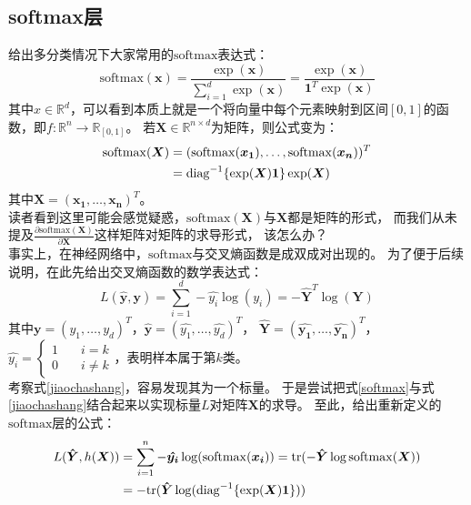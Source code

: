 \documentclass[12pt,a4paper]{ctexart}
\numberwithin{equation}{section}%
\numberwithin{figure}{section}%
\begin{document}
\subsection{softmax层}
给出多分类情况下大家常用的$\mathrm{softmax}$表达式：
\begin{equation}
\mathrm{softmax}(\boldsymbol{x})=\frac{\exp (\boldsymbol{x})}{\sum_{i=1}^d \exp(\boldsymbol{x})}
=\frac{\exp (\boldsymbol{x})}{\boldsymbol{1}^T \exp(\boldsymbol{x})}
\end{equation}
其中$x \in \mathbb{R}^d$，可以看到本质上就是一个将向量中每个元素映射到区间$[0,1]$的函数，即$f:\mathbb{R}^n \rightarrow \mathbb{R}_{[0,1]}$。
若$\boldsymbol{X} \in \mathbb{R}^{n \times d}$为矩阵，则公式变为：
\begin{align}
    \mathrm{softmax}(\boldsymbol{X})&=(\mathrm{softmax}(\boldsymbol{x_1}),\dots,\mathrm{softmax}(\boldsymbol{x_n}))^T \notag \\
    &=\mathrm{diag}^{-1}\{\exp(\boldsymbol{X})\boldsymbol{1}\} \exp(\boldsymbol{X}) \label{softmax}
\end{align}
其中$\boldsymbol{X}=(\boldsymbol{x_1},\dots,\boldsymbol{x_n})^T$。\\
读者看到这里可能会感觉疑惑，$\mathrm{softmax}(\boldsymbol{X})$与$\boldsymbol{X}$都是矩阵的形式，
而我们从未提及$\frac{\partial{\mathrm{softmax}(\boldsymbol{X})}}{\partial{\boldsymbol{X}}}$这样矩阵对矩阵的求导形式，
该怎么办？\\
事实上，在神经网络中，$\mathrm{softmax}$与交叉熵函数是成双成对出现的。
为了便于后续说明，在此先给出交叉熵函数的数学表达式：
\begin{equation}
L(\boldsymbol{\hat{y}},\boldsymbol{y})= \sum_{i=1}^d -\hat{y_i} \log(y_i)=-\boldsymbol{\hat{Y}}^T \log(\boldsymbol{Y}) \label{jiaochashang}
\end{equation}
其中$\boldsymbol{y}=(y_1,\dots,y_d)^T$，$\boldsymbol{\hat{y}}=(\hat{y_1},\dots,\hat{y_d})^T$，
$\hat{\boldsymbol{Y}}= (\boldsymbol{\hat{y_1}},\dots,\boldsymbol{\hat{y_n}})^T$，
$\hat{y_i}
=\left \{ 
    \begin{aligned}
    1 \quad &i=k \\
    0 \quad &i \neq k
    \end{aligned}
    \right .
$，表明样本属于第$k$类。\\
考察式\eqref{jiaochashang}，容易发现其为一个标量。
于是尝试把式\eqref{softmax}与式\eqref{jiaochashang}结合起来以实现标量$L$对矩阵$\boldsymbol{X}$的求导。
至此，给出重新定义的$\mathrm{softmax}$层的公式：
\begin{align}
L(\boldsymbol{\hat{Y}},h(\boldsymbol{X}))
&= \sum_{i=1}^n -\boldsymbol{\hat{y_i}} \log(\mathrm{softmax}(\boldsymbol{x_i}))
=\mathrm{tr}(-\boldsymbol{\hat{Y}} \log\mathrm{softmax}(\boldsymbol{X})) \notag \\
&=-\mathrm{tr}(\boldsymbol{\hat{Y}} \log(\mathrm{diag}^{-1}\{\exp(\boldsymbol{X})\boldsymbol{1}\}))
\end{align}
\end{document}
